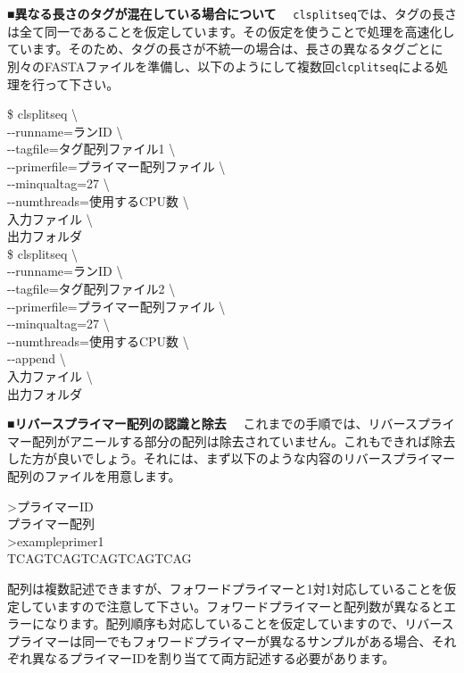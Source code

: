 \documentclass[titlepage,10pt,a4paper,english]{jsbook}
\newenvironment{pre}{\begin{leftbar}\raggedright\ttfamily\footnotesize\setlength{\baselineskip}{1.4em}}{\end{leftbar}\vspace{-1em}}
\newenvironment{cmd}{\begin{oframed}\raggedright\ttfamily\footnotesize\setlength{\baselineskip}{1.4em}}{\end{oframed}\vspace{-1em}}
\begin{document}
\textbf{■異なる長さのタグが混在している場合について　}
\texttt{clsplitseq}では、タグの長さは全て同一であることを仮定しています。その仮定を使うことで処理を高速化しています。そのため、タグの長さが不統一の場合は、長さの異なるタグごとに別々のFASTAファイルを準備し、以下のようにして複数回\texttt{clcplitseq}による処理を行って下さい。
\begin{cmd}
\$ clsplitseq {\textbackslash}\\
{-}{-}runname=ランID {\textbackslash}\\
{-}{-}tagfile=タグ配列ファイル1 {\textbackslash}\\
{-}{-}primerfile=プライマー配列ファイル {\textbackslash}\\
{-}{-}minqualtag=27 {\textbackslash}\\
{-}{-}numthreads=使用するCPU数 {\textbackslash}\\
入力ファイル {\textbackslash}\\
出力フォルダ\\
\$ clsplitseq {\textbackslash}\\
{-}{-}runname=ランID {\textbackslash}\\
{-}{-}tagfile=タグ配列ファイル2 {\textbackslash}\\
{-}{-}primerfile=プライマー配列ファイル {\textbackslash}\\
{-}{-}minqualtag=27 {\textbackslash}\\
{-}{-}numthreads=使用するCPU数 {\textbackslash}\\
{-}{-}append {\textbackslash}\\
入力ファイル {\textbackslash}\\
出力フォルダ
\end{cmd}

\textbf{■リバースプライマー配列の認識と除去　}
これまでの手順では、リバースプライマー配列がアニールする部分の配列は除去されていません。これもできれば除去した方が良いでしょう。それには、まず以下のような内容のリバースプライマー配列のファイルを用意します。
\begin{pre}
{\textgreater}プライマーID\\
プライマー配列\\
{\textgreater}exampleprimer1\\
TCAGTCAGTCAGTCAGTCAG
\end{pre}
配列は複数記述できますが、フォワードプライマーと1対1対応していることを仮定していますので注意して下さい。フォワードプライマーと配列数が異なるとエラーになります。配列順序も対応していることを仮定していますので、リバースプライマーは同一でもフォワードプライマーが異なるサンプルがある場合、それぞれ異なるプライマーIDを割り当てて両方記述する必要があります。
\end{document}
